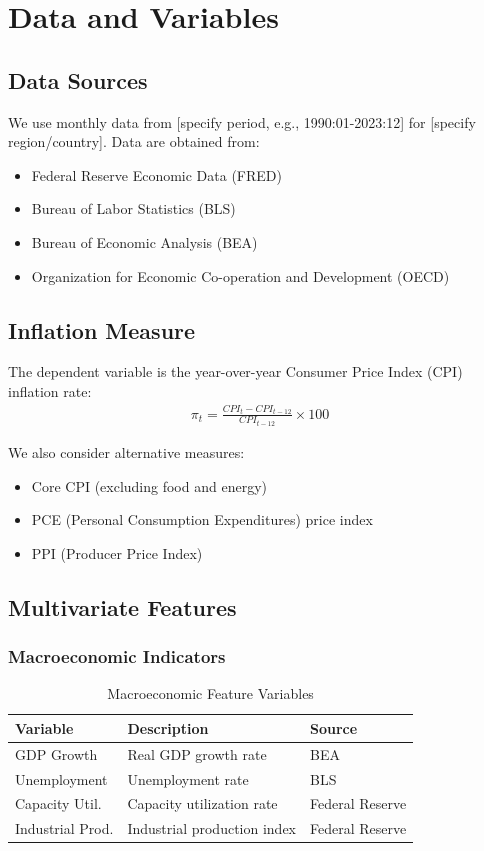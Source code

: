 \section{Data and Variables}

\subsection{Data Sources}

We use monthly data from [specify period, e.g., 1990:01-2023:12] for [specify region/country]. Data are obtained from:

\begin{itemize}
    \item Federal Reserve Economic Data (FRED)
    \item Bureau of Labor Statistics (BLS)
    \item Bureau of Economic Analysis (BEA)
    \item Organization for Economic Co-operation and Development (OECD)
\end{itemize}

\subsection{Inflation Measure}

The dependent variable is the year-over-year Consumer Price Index (CPI) inflation rate:
\begin{align}
    \pi_t = \frac{CPI_t - CPI_{t-12}}{CPI_{t-12}} \times 100
\end{align}

We also consider alternative measures:
\begin{itemize}
    \item Core CPI (excluding food and energy)
    \item PCE (Personal Consumption Expenditures) price index
    \item PPI (Producer Price Index)
\end{itemize}

\subsection{Multivariate Features}

\subsubsection{Macroeconomic Indicators}

\begin{table}[h]
\centering
\caption{Macroeconomic Feature Variables}
\begin{tabular}{lll}
\toprule
Variable & Description & Source \\
\midrule
GDP Growth & Real GDP growth rate & BEA \\
Unemployment & Unemployment rate & BLS \\
Capacity Util. & Capacity utilization rate & Federal Reserve \\
Industrial Prod. & Industrial production index & Federal Reserve \\
\bottomrule
\end{tabular}
\end{table}

